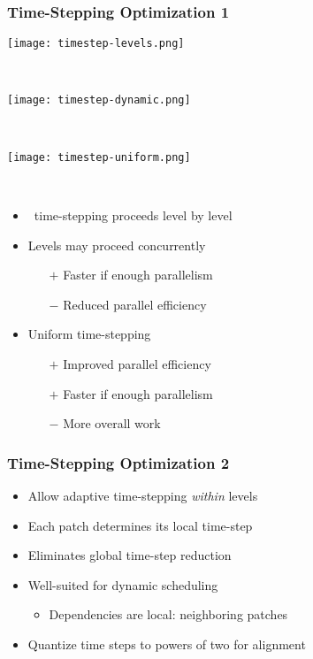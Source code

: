     \begin{frame}[fragile] \frametitle{Time-Stepping Optimization 1}
\begin{minipage}{1.3in}
\texttt{[image: timestep-levels.png]}
\end{minipage} \
\begin{minipage}{1.3in}
\texttt{[image: timestep-dynamic.png]}
\end{minipage} \
\begin{minipage}{1.3in}
\texttt{[image: timestep-uniform.png]}
\end{minipage} \
\begin{itemize}
\enhance{1}\item \enzo\ time-stepping proceeds level by level
\enhance{2}\item Levels may proceed concurrently
  \begin{itemize}
  \enhance{3}\item[$+$] Faster if enough parallelism
  \enhance{4}\item[$-$] Reduced parallel efficiency
  \end{itemize}
\enhance{5}\item Uniform time-stepping
  \begin{itemize}
  \item[$+$] Improved parallel efficiency
  \enhance{6}\item[$+$] Faster if enough parallelism
  \enhance{7}\item[$-$] More overall work
  \end{itemize}
\end{itemize}
\end{frame}

    \begin{frame}[fragile] \frametitle{Time-Stepping Optimization 2}
\begin{itemize}
\enhance{1}\item Allow adaptive time-stepping \textit{within} levels
\enhance{2}\item Each patch determines its local time-step
\enhance{3}\item Eliminates global time-step reduction
\item Well-suited for dynamic scheduling
\begin{itemize}
\enhance{4}\item Dependencies are local: neighboring patches
\end{itemize}
\enhance{5}\item Quantize time steps to powers of two for alignment
\end{itemize}
\end{frame}
